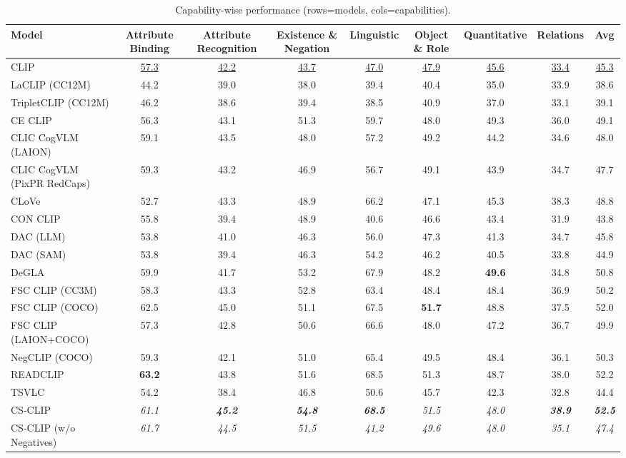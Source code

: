 \begin{table}[t]
  \centering
  \scriptsize
  \caption{Capability-wise performance (rows=models, cols=capabilities).}
  \label{tab:caps_models_rows}
  \begin{adjustbox}{max width=\textwidth}
  \setlength{\tabcolsep}{2pt}
  \begin{tabular}{p{5.0cm}cccccccc}
    \toprule
    Model & Attribute Binding & Attribute Recognition & Existence \& Negation & Linguistic & Object \& Role & Quantitative & Relations & Avg \\
    \midrule
    CLIP & \underline{57.3} & \underline{42.2} & \underline{43.7} & \underline{47.0} & \underline{47.9} & \underline{45.6} & \underline{33.4} & \underline{45.3} \\
    \midrule
    LaCLIP (CC12M) & 44.2 & 39.0 & 38.0 & 39.4 & 40.4 & 35.0 & 33.9 & 38.6 \\
    TripletCLIP (CC12M) & 46.2 & 38.6 & 39.4 & 38.5 & 40.9 & 37.0 & 33.1 & 39.1 \\
    \midrule
    CE CLIP & 56.3 & 43.1 & 51.3 & 59.7 & 48.0 & 49.3 & 36.0 & 49.1 \\
    CLIC CogVLM (LAION) & 59.1 & 43.5 & 48.0 & 57.2 & 49.2 & 44.2 & 34.6 & 48.0 \\
    CLIC CogVLM (PixPR RedCaps) & 59.3 & 43.2 & 46.9 & 56.7 & 49.1 & 43.9 & 34.7 & 47.7 \\
    CLoVe & 52.7 & 43.3 & 48.9 & 66.2 & 47.1 & 45.3 & 38.3 & 48.8 \\
    CON CLIP & 55.8 & 39.4 & 48.9 & 40.6 & 46.6 & 43.4 & 31.9 & 43.8 \\
    DAC (LLM) & 53.8 & 41.0 & 46.3 & 56.0 & 47.3 & 41.3 & 34.7 & 45.8 \\
    DAC (SAM) & 53.8 & 39.4 & 46.3 & 54.2 & 46.2 & 40.5 & 33.8 & 44.9 \\
    DeGLA & 59.9 & 41.7 & 53.2 & 67.9 & 48.2 & \textbf{49.6} & 34.8 & 50.8 \\
    FSC CLIP (CC3M) & 58.3 & 43.3 & 52.8 & 63.4 & 48.4 & 48.4 & 36.9 & 50.2 \\
    FSC CLIP (COCO) & 62.5 & 45.0 & 51.1 & 67.5 & \textbf{51.7} & 48.8 & 37.5 & 52.0 \\
    FSC CLIP (LAION+COCO) & 57.3 & 42.8 & 50.6 & 66.6 & 48.0 & 47.2 & 36.7 & 49.9 \\
    NegCLIP (COCO) & 59.3 & 42.1 & 51.0 & 65.4 & 49.5 & 48.4 & 36.1 & 50.3 \\
    READCLIP & \textbf{63.2} & 43.8 & 51.6 & 68.5 & 51.3 & 48.7 & 38.0 & 52.2 \\
    TSVLC & 54.2 & 38.4 & 46.8 & 50.6 & 45.7 & 42.3 & 32.8 & 44.4 \\
    \midrule
    CS-CLIP & \emph{61.1} & \textbf{\emph{45.2}} & \textbf{\emph{54.8}} & \textbf{\emph{68.5}} & \emph{51.5} & \emph{48.0} & \textbf{\emph{38.9}} & \textbf{\emph{52.5}} \\
    CS-CLIP (w/o Negatives) & \emph{61.7} & \emph{44.5} & \emph{51.5} & \emph{41.2} & \emph{49.6} & \emph{48.0} & \emph{35.1} & \emph{47.4} \\
    \bottomrule
  \end{tabular}
  \end{adjustbox}
\end{table}


